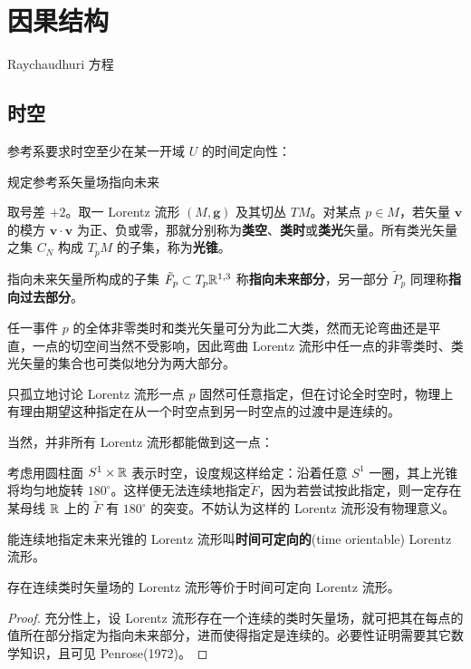 \chapter{因果结构}\label{chpt:causal}

Raychaudhuri 方程

\section{时空}


参考系要求时空至少在某一开域 $U$ 的时间定向性：

规定参考系矢量场指向未来

取号差 $+2$。取一 Lorentz 流形 $(M,\bm g)$ 及其切丛 $TM$。对某点 $p\in M$，若矢量 $\bm v$ 的模方 $\bm v \cdot \bm v$ 为正、负或零，那就分别称为\textbf{类空}、\textbf{类时}或\textbf{类光}矢量。所有类光矢量之集 $C_N$ 构成 $T_p M$ 的子集，称为\textbf{光锥}。

指向未来矢量所构成的子集 $\tilde F_p\subset T_p\mathbb{R}^{1,3}$ 称\textbf{指向未来部分}，另一部分 $\tilde P_p$ 同理称\textbf{指向过去部分}。

任一事件 $p$ 的全体非零类时和类光矢量可分为此二大类，然而无论弯曲还是平直，一点的切空间当然不受影响，因此弯曲 Lorentz 流形中任一点的非零类时、类光矢量的集合也可类似地分为两大部分。

只孤立地讨论 Lorentz 流形一点 $p$ 固然可任意指定，但在讨论全时空时，物理上有理由期望这种指定在从一个时空点到另一时空点的过渡中是连续的。

当然，并非所有 Lorentz 流形都能做到这一点：
    \begin{eg}
        考虑用圆柱面 $S^1\times\mathbb{R}$ 表示时空，设度规这样给定：沿着任意 $S^1$ 一圈，其上光锥将均匀地旋转 $180^\circ$。这样便无法连续地指定$\tilde F$，因为若尝试按此指定，则一定存在某母线 $\mathbb{R}$ 上的 $\tilde F$ 有 $180^\circ$ 的突变。不妨认为这样的 Lorentz 流形没有物理意义。
    \end{eg}
\begin{definition}
    能连续地指定未来光锥的 Lorentz 流形叫\textbf{时间可定向的}(time orientable) Lorentz 流形。
\end{definition}
\begin{theorem}
    存在连续类时矢量场的 Lorentz 流形等价于时间可定向 Lorentz 流形。
\end{theorem}
\begin{proof}
    充分性上，设 Lorentz 流形存在一个连续的类时矢量场，就可把其在每点的值所在部分指定为指向未来部分，进而使得指定是连续的。必要性证明需要其它数学知识，且可见 Penrose(1972)。
\end{proof}


